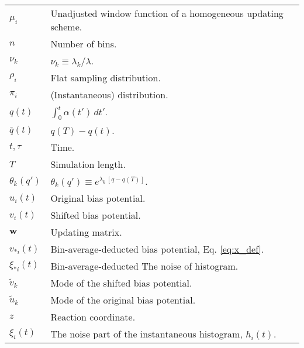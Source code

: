\documentclass[preprint, superscriptaddress, floatfix]{revtex4-1}
\begin{document}
{\begin{table*}
\begin{tabular}{l | p{12cm} }
    $\mu_i$         &   Unadjusted window function of a homogeneous updating scheme. \\
    $n$             &   Number of bins. \\
    $\nu_k$         &   $\nu_k \equiv \lambda_k / \lambda$. \\
    $\rho_i$        &   Flat sampling distribution. \\
    $\pi_i$         &   (Instantaneous) distribution. \\
    $q(t)$          &   $\int_0^t \alpha(t') \, dt'$.  \\
    $\bar q(t)$     &   $q(T) - q(t)$.  \\
    $t, \tau$       &   Time. \\
    $T$             &   Simulation length. \\
    $\theta_k(q')$       &   $\theta_k(q') \equiv e^{\lambda_k \, [q - q(T)]}$. \\
    $u_i(t)$        &   Original bias potential. \\
    $v_i(t)$        &   Shifted bias potential. \\
    $\mathbf w$     &   Updating matrix. \\
    $v_{*i}(t)$     &   Bin-average-deducted bias potential, Eq. \eqref{eq:x_def}. \\
    $\xi_{*i}(t)$   &   Bin-average-deducted The noise of histogram. \\
    ${\tilde v}_k$  &   Mode of the shifted bias potential. \\
    ${\tilde u}_k$  &   Mode of the original bias potential. \\
    $z$             &   Reaction coordinate. \\
    $\xi_i(t)$    &   The noise part of the instantaneous histogram, $h_i(t)$.
  \end{tabular}
  \end{table*}
}


\end{document}
